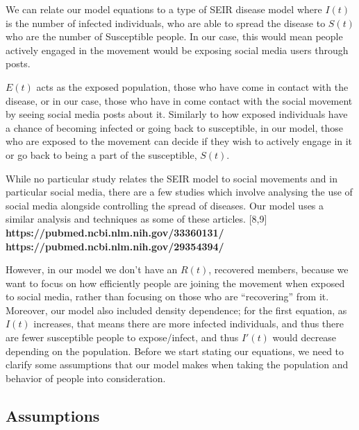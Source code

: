 \documentclass{article}
\begin{document}
    We can relate our model equations to a type of SEIR disease model where $I(t)$ is the number of infected individuals, who are able to spread the disease to $S(t)$ who are the number of Susceptible people. In our case, this would mean people actively engaged in the movement would be exposing social media users through posts. 
    
    
    $E(t)$ acts as the exposed population, those who have come in contact with the disease, or in our case, those who have in come contact with the social movement by seeing social media posts about it. Similarly to how exposed individuals have a chance of becoming infected or going back to susceptible, in our model, those who are exposed to the movement can decide if they wish to actively engage in it or go back to being a part of the susceptible, $S(t)$.

    While no particular study relates the SEIR model to social movements and in particular social media, there are a few studies which involve analysing the use of social media alongside controlling the spread of diseases. Our model uses a similar analysis and techniques as some of these articles. [8,9]
\textbf{https://pubmed.ncbi.nlm.nih.gov/33360131/}
\textbf{https://pubmed.ncbi.nlm.nih.gov/29354394/}
    
    
    
    
    However, in our model we don’t have an $R(t)$, recovered members, because we want to focus on how efficiently people are joining the movement when exposed to social media, rather than focusing on those who are “recovering” from it. Moreover, our model also included density dependence; for the first equation, as $I(t)$ increases, that means there are more infected individuals, and thus there are fewer susceptible people to expose/infect, and thus $I'(t)$ would decrease depending on the population.
    Before we start stating our equations, we need to clarify some assumptions that our model makes when taking the population and behavior of people into consideration.

    \subsection{Assumptions}
    
\end{document}
